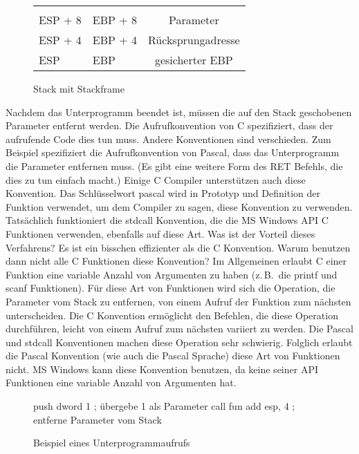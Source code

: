 \begin{figure}[ht]
\centering
\begin{tabular}{ll|c|}
 \cline{3-3}
 &  & \\
 \cline{3-3}
 ESP + 8 & EBP + 8 & Parameter \\
 \cline{3-3}
 ESP + 4 & EBP + 4 & R\"{u}cksprungadresse \\
 \cline{3-3}
 ESP     & EBP     & gesicherter EBP \\
 \cline{3-3}
\end{tabular}
\caption{Stack mit Stackframe}  \label{fig:stack3}
\end{figure}

Nachdem das Unterprogramm beendet ist, m\"{u}ssen die auf den Stack
geschobenen Parameter entfernt werden. Die Aufrufkonvention
 von C spezifiziert, dass der aufrufende
Code dies tun muss. Andere Konventionen sind verschieden. Zum
Beispiel spezifiziert die Aufrufkonvention
 von Pascal, dass das Unterprogramm
die Parameter entfernen muss. (Es gibt eine weitere Form des RET
 Befehls, die dies zu tun einfach macht.)
Einige C Compiler unterst\"{u}tzen auch diese Konvention. Das
Schl\"{u}sselwort {\code pascal} wird in Prototyp und Definition der
Funktion verwendet, um dem Compiler zu sagen, diese Konvention zu
verwenden. Tats\"{a}chlich funktioniert die {\code stdcall} Konvention,
 die die MS Windows API 
C Funktionen verwenden, ebenfalls auf diese Art. Was ist der Vorteil
dieses Verfahrens? Es ist ein bisschen effizienter als die C
Konvention. Warum benutzen dann nicht alle C Funktionen diese
Konvention? Im Allgemeinen erlaubt C einer Funktion eine variable
Anzahl von Argumenten zu haben (z.\,B.\ die {\code printf}
 und {\code scanf}  Funktionen). F\"{u}r
diese Art von Funktionen wird sich die Operation, die Parameter vom
Stack zu entfernen, von einem Aufruf der Funktion zum n\"{a}chsten
unterscheiden. Die C Konvention erm\"{o}glicht den Befehlen, die diese
Operation durchf\"{u}hren, leicht von einem Aufruf zum n\"{a}chsten variiert
zu werden. Die Pascal und stdcall Konventionen machen diese
Operation sehr schwierig. Folglich erlaubt die Pascal Konvention
(wie auch die Pascal Sprache) diese Art von Funktionen nicht. MS
Windows kann diese Konvention benutzen, da keine seiner API
Funktionen eine variable Anzahl von Argumenten hat.

\begin{figure}[ht]
\begin{AsmCodeListing}[frame=single, numbers=left, commandchars=\\\{\}]
      push   dword 1        ; \"{u}bergebe 1 als Parameter
      call   fun
      add    esp, 4         ; entferne Parameter vom Stack  \label{line:subcall}
\end{AsmCodeListing}
\caption{Beispiel eines Unterprogrammaufrufs \label{fig:subcall}}
\end{figure}

